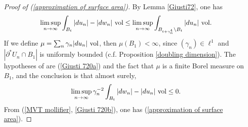 
\begin{proof}[Proof of (\ref{approximation of surface area})]
By Lemma \ref{Giusti72}, one has
\begin{equation}\label{Giusti 720a}
\limsup_{n \to \infty} \int_{B_t} |du_n| - |dw_n| ~\mathrm{vol} \leq \limsup_{n \to \infty} \int_{B_{t + \gamma_n^4} \setminus B_t} |du_n| ~\mathrm{vol}.
\end{equation}
If we define $\mu = \sum_n \gamma_n|du_n| ~\mathrm{vol}$, then $\mu(B_1) < \infty$, since $(\gamma_n) \in \ell^1$ and $|\partial^* U_n \cap B_1|$ is uniformly bounded (c.f. Proposition \ref{doubling dimension}).
The hypotheses of \cite[(7.20)]{Giusti77} are (\ref{Giusti 720a}) and the fact that $\mu$ is a finite Borel measure on $B_1$, and the conclusion is that almost surely,
\begin{equation}\label{Giusti 720b}
\limsup_{n \to \infty} \gamma_n^{-2} \int_{B_t} |dw_n| - |du_n| ~\mathrm{vol} \leq 0.
\end{equation}
From (\ref{MVT mollifier}, \ref{Giusti 720b}), one has (\ref{approximation of surface area}).
\end{proof}

